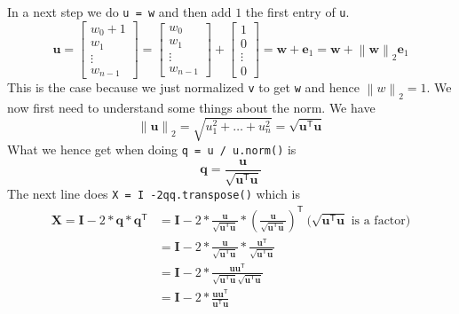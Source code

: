 \documentclass{article}
\begin{document}
In a next step we do \verb|u = w| and then add $1$ the first entry of \verb|u|.
\begin{equation*}
    \mathbf{u} = 
    \begin{bmatrix}
    w_{0} + 1 \\
    w_{1} \\
    \vdots \\
    w_{n - 1}
    \end{bmatrix} = 
    \begin{bmatrix}
      w_{0} \\
    w_{1} \\
    \vdots \\
    w_{n - 1}  
    \end{bmatrix} + 
    \begin{bmatrix}
        1 \\
        0 \\
        \vdots \\
        0
    \end{bmatrix}
    = \mathbf{w} + \mathbf{e}_{1} = \mathbf{w} + \left\lVert \mathbf{w} \right\rVert_{2}\mathbf{e}_{1}
\end{equation*}
This is the case because we just normalized \verb|v| to get \verb|w| and hence $\left\lVert w \right\rVert_{2} = 1$. We now first need to understand some things about the norm. We have
\begin{equation*}
    \left\lVert \mathbf{u} \right\rVert_{2} = \sqrt{u_{1}^{2} + \dots + u_{n}^{2}} = \sqrt{\mathbf{u}^{\mathsf{T}}\mathbf{u}}
\end{equation*} 
What we hence get when doing \verb|q = u / u.norm()| is
\begin{equation*}
   \mathbf{q} = \frac{\mathbf{u}}{\sqrt{\mathbf{u}^{\mathsf{T}}\mathbf{u}}}
\end{equation*}
The next line does \verb|X = I -2qq.transpose()| which is
\begin{align*}
    \mathbf{X} = \mathbf{I} - 2 * \mathbf{q} * \mathbf{q}^{\mathsf{T}} &= \mathbf{I} - 2 * \frac{\mathbf{u}}{\sqrt{\mathbf{u}^{\mathsf{T}}\mathbf{u}}} * \left(\frac{\mathbf{u}}{\sqrt{\mathbf{u}^{\mathsf{T}}\mathbf{u}}}\right)^{\mathsf{T}} \: \text{($\sqrt{\mathbf{u}^{\mathsf{T}}\mathbf{u}}$ is a factor)}\\
   &= \mathbf{I} - 2 * \frac{\mathbf{u}}{\sqrt{\mathbf{u}^{\mathsf{T}}\mathbf{u}}} * \frac{\mathbf{u}^{\mathsf{T}}}{\sqrt{\mathbf{u}^{\mathsf{T}}\mathbf{u}}} \\
    &= \mathbf{I} - 2 * \frac{\mathbf{u}\mathbf{u}^{\mathsf{T}}}{\sqrt{\mathbf{u}^{\mathsf{T}}\mathbf{u}}\sqrt{\mathbf{u}^{\mathsf{T}}\mathbf{u}}} \\
    &= \mathbf{I} - 2 * \frac{\mathbf{u}\mathbf{u}^{\mathsf{T}}}{\mathbf{u}^{\mathsf{T}}\mathbf{u}}
\end{align*}
\end{document}
